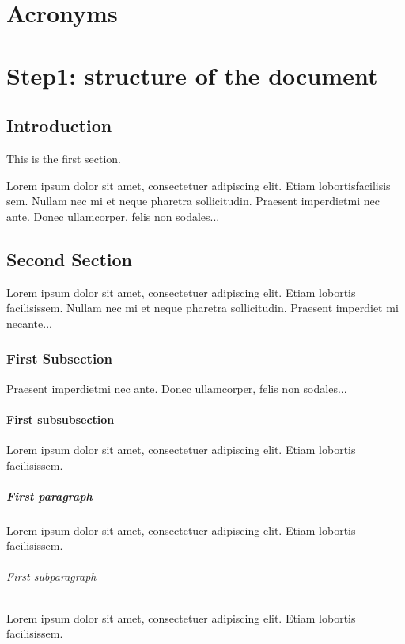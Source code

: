 \documentclass[a4paper, oneside]{book}
\begin{document}


\tableofcontents
\listoffigures
\listoftables
\printglossary
\clearpage
\chapter*{Acronyms}
\begin{acronym}
\end{acronym}


\chapter{Step1: structure of the document}

\section{Introduction}

This is the first section.

Lorem  ipsum  dolor  sit  amet,  consectetuer  adipiscing  
elit. Etiam  lobortisfacilisis sem.  Nullam nec mi et 
neque pharetra sollicitudin.  Praesent imperdietmi nec ante. 
Donec ullamcorper, felis non sodales...

\section{Second Section}

Lorem ipsum dolor sit amet, consectetuer adipiscing elit.  
Etiam lobortis facilisissem.  Nullam nec mi et neque pharetra 
sollicitudin.  Praesent imperdiet mi necante...

\subsection{First Subsection}
Praesent imperdietmi nec ante. Donec ullamcorper, felis non sodales...

\subsubsection{First subsubsection}
Lorem ipsum dolor sit amet, consectetuer adipiscing elit.  
Etiam lobortis facilisissem.
\paragraph{First paragraph}
Lorem ipsum dolor sit amet, consectetuer adipiscing elit.  
Etiam lobortis facilisissem.
\subparagraph{First subparagraph}
Lorem ipsum dolor sit amet, consectetuer adipiscing elit.  
Etiam lobortis facilisissem.
\end{document}
